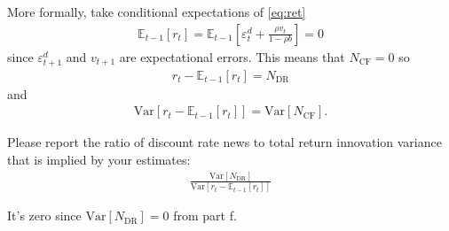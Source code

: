 More formally, take conditional expectations of \eqref{eq:ret}
\begin{align}
    \mathbb{E}_{t-1} [r_{t}] = \mathbb{E}_{t-1} \left[ \varepsilon_{t}^{d}+\frac{\rho v_{t}}{1-\rho b}  \right] = 0
\end{align}
since $\varepsilon_{t+1}^d$ and $v_{t+1}$ are expectational errors. This means that $N_\text{CF}=0$ so
\begin{align}
    r_t - \mathbb{E}_{t-1} [r_t] = N_{\text{DR}}
\end{align}
and
\begin{align}
    \text{Var} \left[ r_t - \mathbb{E}_{t-1} [r_t] \right] = \text{Var} [N_\text{CF}].
\end{align}






\begin{answer}[Part g]
Please report the ratio of discount rate news to total return innovation variance that is implied by your estimates:
\begin{align}
    \frac{\text{Var}[N_{\text{DR}}]}{\text{Var}[r_t - \mathbb{E}_{t-1}[r_t]]}
\end{align}
\end{answer}
It's zero since $\text{Var}[N_\text{DR}]=0$ from part f.

